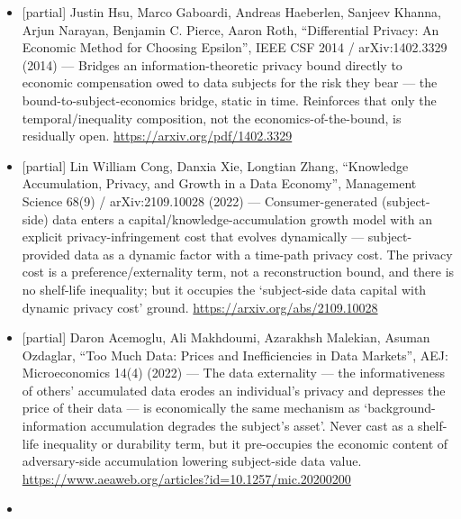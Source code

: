 \documentclass[
  11pt,
]{article}
\begin{document}
\begin{itemize}
  Ghosh-Roth 2011 auction lineage) (2012) --- Covers the subject-owned
  valuation half in static form: data subjects are compensated in
  proportion to an information-theoretic privacy-loss quantity
  (differential-privacy leakage) --- i.e., an information-theoretic
  bound already prices subject-owned data. No time clock and no
  Mosca-form inequality, but it blocks any reading of the claim as
  `first to price subject-owned data by an information-theoretic bound'.
  \url{https://arxiv.org/pdf/1208.5258}
\item
  {[}partial{]} Justin Hsu, Marco Gaboardi, Andreas Haeberlen, Sanjeev
  Khanna, Arjun Narayan, Benjamin C. Pierce, Aaron Roth, ``Differential
  Privacy: An Economic Method for Choosing Epsilon'', IEEE CSF 2014 /
  arXiv:1402.3329 (2014) --- Bridges an information-theoretic privacy
  bound directly to economic compensation owed to data subjects for the
  risk they bear --- the bound-to-subject-economics bridge, static in
  time. Reinforces that only the temporal/inequality composition, not
  the economics-of-the-bound, is residually open.
  \url{https://arxiv.org/pdf/1402.3329}
\item
  {[}partial{]} Lin William Cong, Danxia Xie, Longtian Zhang,
  ``Knowledge Accumulation, Privacy, and Growth in a Data Economy'',
  Management Science 68(9) / arXiv:2109.10028 (2022) ---
  Consumer-generated (subject-side) data enters a
  capital/knowledge-accumulation growth model with an explicit
  privacy-infringement cost that evolves dynamically ---
  subject-provided data as a dynamic factor with a time-path privacy
  cost. The privacy cost is a preference/externality term, not a
  reconstruction bound, and there is no shelf-life inequality; but it
  occupies the `subject-side data capital with dynamic privacy cost'
  ground. \url{https://arxiv.org/abs/2109.10028}
\item
  {[}partial{]} Daron Acemoglu, Ali Makhdoumi, Azarakhsh Malekian,
  Asuman Ozdaglar, ``Too Much Data: Prices and Inefficiencies in Data
  Markets'', AEJ: Microeconomics 14(4) (2022) --- The data externality
  --- the informativeness of others' accumulated data erodes an
  individual's privacy and depresses the price of their data --- is
  economically the same mechanism as `background-information
  accumulation degrades the subject's asset'. Never cast as a shelf-life
  inequality or durability term, but it pre-occupies the economic
  content of adversary-side accumulation lowering subject-side data
  value. \url{https://www.aeaweb.org/articles?id=10.1257/mic.20200200}
\item

\end{itemize}
\end{document}
